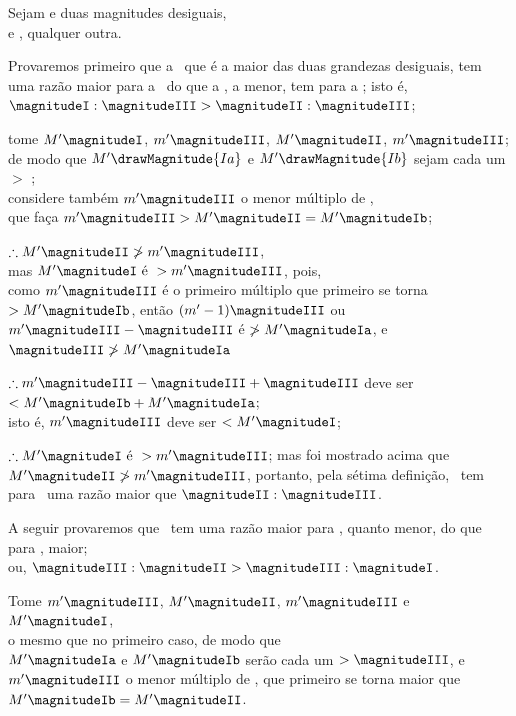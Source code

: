 \documentclass[booklanguage=brazilian]{byrnebook}
\begin{document}
\begin{center}
Sejam  e  duas magnitudes desiguais,\\
e , qualquer outra.
\end{center}

Provaremos primeiro que a \magnitudeI\ que é a maior das duas grandezas desiguais, tem uma razão maior para a \magnitudeIII\ do que a \magnitudeII, a menor, tem para a \magnitudeIII; isto é, $\magnitudeI : \magnitudeIII > \magnitudeII : \magnitudeIII$;

\begin{center}
tome $M' \magnitudeI$, $m' \magnitudeIII$, $M' \magnitudeII$, $m' \magnitudeIII$;\\
de modo que $M' \drawMagnitude{Ia}$ e $M' \drawMagnitude{Ib}$ sejam cada um $>$ \magnitudeIII;\\
considere também $m' \magnitudeIII$ o menor múltiplo de \magnitudeIII,\\
que faça $m' \magnitudeIII > M' \magnitudeII = M' \magnitudeIb$;

$\therefore M' \magnitudeII \ngtr m' \magnitudeIII$,\\ %
mas $M' \magnitudeI \mbox{ é } > m' \magnitudeIII$, pois,\\
como $m' \magnitudeIII$ é o primeiro múltiplo que primeiro se torna $> M' \magnitudeIb$, então $(m' - 1)\magnitudeIII$ ou $m' \magnitudeIII - \magnitudeIII$ é $\ngtr M' \magnitudeIa$, e $\magnitudeIII \ngtr M' \magnitudeIa$ %

$\therefore m' \magnitudeIII - \magnitudeIII + \magnitudeIII$ deve ser $< M' \magnitudeIb + M' \magnitudeIa$;\\ %
isto é, $m' \magnitudeIII$ deve ser $< M' \magnitudeI$;

$\therefore M' \magnitudeI \mbox{ é } > m' \magnitudeIII$; mas foi mostrado acima que $M' \magnitudeII \ngtr m' \magnitudeIII$, portanto, pela sétima definição, \magnitudeI\ tem para \magnitudeIII\ uma razão maior que $\magnitudeII : \magnitudeIII$. %

A seguir provaremos que \magnitudeIII\ tem uma razão maior para \magnitudeII, quanto menor, do que para \magnitudeI, maior;\\
ou, $\magnitudeIII : \magnitudeII > \magnitudeIII : \magnitudeI$.

Tome $m' \magnitudeIII$, $M' \magnitudeII$, $m' \magnitudeIII$ e $M' \magnitudeI$,\\
o mesmo que no primeiro caso, de modo que\\
$M' \magnitudeIa$ e $M' \magnitudeIb$ serão cada um $> \magnitudeIII$, e $m' \magnitudeIII$ o menor múltiplo de \magnitudeIII, que primeiro se torna maior que $M' \magnitudeIb = M' \magnitudeII$.


\end{center}
\end{document}
